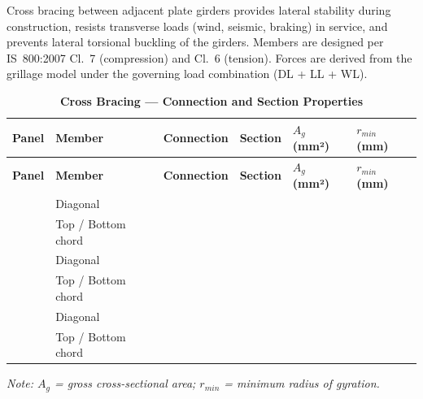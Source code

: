 \documentclass[12pt,a4paper]{report}
\numberwithin{table}{chapter}
\numberwithin{figure}{chapter}
\begin{document}
Cross bracing between adjacent plate girders provides lateral stability during construction, resists transverse loads (wind, seismic, braking) in service, and prevents lateral torsional buckling of the girders. Members are designed per IS~800:2007 Cl.~7 (compression) and Cl.~6 (tension). Forces are derived from the grillage model under the governing load combination  (DL + LL + WL).

\vspace{1em}

\vspace{0.4em}
\noindent
\setlength{\tabcolsep}{4pt}
\setlength\LTleft{0pt}
\setlength\LTright{\fill}

\begin{longtable}{|C{2.0cm}|L{2.0cm}|L{2.2cm}|C{2.5cm}|C{2.0cm}|C{2.0cm}|}
\caption{\textbf{Cross Bracing --- Connection and Section Properties}}
\hline
\textbf{Panel} & \textbf{Member} & \textbf{Connection} & \textbf{Section} & \textbf{$A_g$ (mm²)} & \textbf{$r_{min}$ (mm)} \\[6pt]
\hline

\endfirsthead
\hline
\textbf{Panel} & \textbf{Member} & \textbf{Connection} & \textbf{Section} & \textbf{$A_g$ (mm²)} & \textbf{$r_{min}$ (mm)} \\[6pt]
\hline
\endhead
{} & Diagonal &  &  &  &  \\[6pt]
 & Top / Bottom chord &  &  &  &  \\[6pt]
\hline
{} & Diagonal &  &  &  &  \\[6pt]
 & Top / Bottom chord &  &  &  &  \\[6pt]
\hline
{} & Diagonal &  &  &  &  \\[6pt]
 & Top / Bottom chord &  &  &  &  \\[6pt]
\hline
\end{longtable}
\noindent\textit{Note: $A_g$ = gross cross-sectional area; $r_{min}$ = minimum radius of gyration.}
\end{document}
